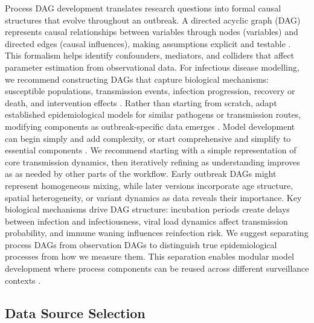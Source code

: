 \documentclass{article}
\begin{document}
Process DAG development translates research questions into formal causal structures that evolve throughout an outbreak.
A directed acyclic graph (DAG) represents causal relationships between variables through nodes (variables) and directed edges (causal influences), making assumptions explicit and testable \citep{digitale2022tutorial}.
This formalism helps identify confounders, mediators, and colliders that affect parameter estimation from observational data.
For infectious disease modelling, we recommend constructing DAGs that capture biological mechanisms: susceptible populations, transmission events, infection progression, recovery or death, and intervention effects \citep{deangelis2018analysing}.
Rather than starting from scratch, adapt established epidemiological models for similar pathogens or transmission routes, modifying components as outbreak-specific data emerges \citep{gelman2020bayesian}.
Model development can begin simply and add complexity, or start comprehensive and simplify to essential components \citep{gelman2020bayesian}.
We recommend starting with a simple representation of core transmission dynamics, then iteratively refining as understanding improves as as needed by other parts of the workflow.
Early outbreak DAGs might represent homogeneous mixing, while later versions incorporate age structure, spatial heterogeneity, or variant dynamics as data reveals their importance.
Key biological mechanisms drive DAG structure: incubation periods create delays between infection and infectiousness, viral load dynamics affect transmission probability, and immune waning influences reinfection risk.
We suggest separating process DAGs from observation DAGs to distinguish true epidemiological processes from how we measure them.
This separation enables modular model development where process components can be reused across different surveillance contexts \citep{nicholson2022interoperability}.

\subsection{Data Source Selection}
\end{document}
